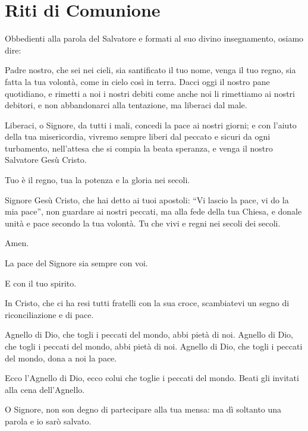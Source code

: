 

\section*{Riti di Comunione}

	\begin{dialoghi}
		\item[\sacerdote] Obbedienti alla parola del Salvatore e formati al suo divino insegnamento, osiamo dire:
		\item[\assemblea] Padre nostro, che sei nei cieli, sia santificato il tuo nome, venga il tuo regno, sia fatta la tua volontà, come in cielo così in terra. Dacci oggi il nostro pane quotidiano, e rimetti a noi i nostri debiti come anche noi li rimettiamo ai nostri debitori, e non abbandonarci alla tentazione, ma liberaci dal male.
		\item[\sacerdote] Liberaci, o Signore, da tutti i mali, concedi la pace ai nostri giorni; e con l'aiuto della tua misericordia, vivremo sempre liberi dal peccato e sicuri da ogni turbamento, nell'attesa che si compia la beata speranza, e venga il nostro Salvatore Gesù Cristo.
		\item[\assemblea] Tuo è il regno, tua la potenza e la gloria nei secoli.
		\item[\sacerdote] Signore Gesù Cristo, che hai detto ai tuoi apostoli: \textquotedblleft Vi lascio la pace, vi do la mia pace\textquotedblright, non guardare ai nostri peccati, ma alla fede della tua Chiesa, e donale unità e pace secondo la tua volontà. Tu che vivi e regni nei secoli dei secoli.
		\item[\assemblea] Amen.
		\item[\sacerdote] La pace del Signore sia sempre con voi.
		\item[\assemblea] E con il tuo spirito.
		\item[\sacerdote] In Cristo, che ci ha resi tutti fratelli con la sua croce, scambiatevi un segno di riconciliazione e di pace.

		\item[\assemblea] Agnello di Dio, che togli i peccati del mondo, abbi pietà di noi. Agnello di Dio, che togli i peccati del mondo, abbi pietà di noi. Agnello di Dio, che togli i peccati del mondo, dona a noi la pace.
		\item[\sacerdote] Ecco l'Agnello di Dio, ecco colui che toglie i peccati del mondo. Beati gli invitati alla cena dell'Agnello.
		\item[\assemblea] O Signore, non son degno di partecipare alla tua mensa: ma dì soltanto una parola e io sarò salvato.
	\end{dialoghi}

